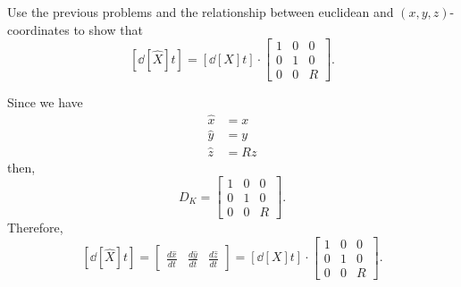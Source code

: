 \documentclass{ximera}
\begin{document}
\begin{problem}
  Use the previous problems and the relationship between euclidean and $\left(x,y,z\right)$-coordinates to show that
  \[
  \left[\dd[\hat{X}]{t}\right] = \left[ \dd[X]{t}\right] \cdot
  \begin{bmatrix}
    1 & 0 & 0\\
    0 & 1 & 0\\
    0 & 0 & R
  \end{bmatrix}.
  \]
  
\begin{freeResponse}
Since we have 
\begin{align*}
\hat{x}  &  =x\\
\hat{y}  &  =y\\
\hat{z}  &  =Rz
\end{align*}
then, 
\[
D_K = 
 \begin{bmatrix}
    1 & 0 & 0\\
    0 & 1 & 0\\
    0 & 0 & R
  \end{bmatrix}.
  \]
  Therefore, 
  \[
 \left[\dd[\hat{X}]{t}\right] 
= \begin{bmatrix}
\frac{d\hat{x}}{dt} & \frac{d\hat{y}}{dt} & \frac{d\hat{z}}{dt}%
\end{bmatrix}
= \left[ \dd[X]{t}\right] \cdot
  \begin{bmatrix}
    1 & 0 & 0\\
    0 & 1 & 0\\
    0 & 0 & R
  \end{bmatrix}.
\]
\end{freeResponse}

\end{problem}
\end{document}
